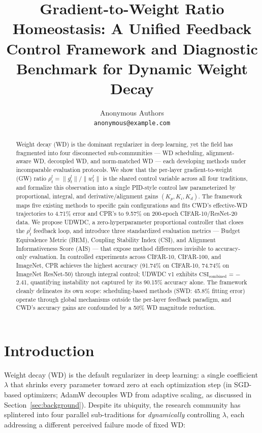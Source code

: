 \documentclass{article}
\title{Gradient-to-Weight Ratio Homeostasis: A Unified Feedback Control Framework and Diagnostic Benchmark for Dynamic Weight Decay}
\author{%
  Anonymous Authors \\
  \texttt{anonymous@example.com}
}
\begin{document}
\maketitle

\begin{abstract}
Weight decay (WD) is the dominant regularizer in deep learning, yet the field has fragmented into four disconnected sub-communities --- WD scheduling, alignment-aware WD, decoupled WD, and norm-matched WD --- each developing methods under incomparable evaluation protocols. We show that the per-layer gradient-to-weight (GW) ratio $\rho_t^l = \|g_t^l\| / \|w_t^l\|$ is the shared control variable across all four traditions, and formalize this observation into a single PID-style control law parameterized by proportional, integral, and derivative/alignment gains $(K_p, K_i, K_d)$. The framework maps five existing methods to specific gain configurations and fits CWD's effective-WD trajectories to 4.71\% error and CPR's to 9.57\% on 200-epoch CIFAR-10/ResNet-20 data. We propose UDWDC, a zero-hyperparameter proportional controller that closes the $\rho_t^l$ feedback loop, and introduce three standardized evaluation metrics --- Budget Equivalence Metric (BEM), Coupling Stability Index (CSI), and Alignment Informativeness Score (AIS) --- that expose method differences invisible to accuracy-only evaluation. In controlled experiments across CIFAR-10, CIFAR-100, and ImageNet, CPR achieves the highest accuracy (91.74\% on CIFAR-10, 74.74\% on ImageNet ResNet-50) through integral control; UDWDC v1 exhibits $\text{CSI}_\text{combined}$ = $-$2.41, quantifying instability not captured by its 90.15\% accuracy alone. The framework cleanly delineates its own scope: scheduling-based methods (SWD: 45.8\% fitting error) operate through global mechanisms outside the per-layer feedback paradigm, and CWD's accuracy gains are confounded by a 50\% WD magnitude reduction.
\end{abstract}

\section{Introduction}

Weight decay (WD) is the default regularizer in deep learning: a single coefficient $\lambda$ that shrinks every parameter toward zero at each optimization step (in SGD-based optimizers; AdamW decouples WD from adaptive scaling, as discussed in Section~\ref{sec:background}). Despite its ubiquity, the research community has splintered into four parallel sub-traditions for \textit{dynamically} controlling $\lambda$, each addressing a different perceived failure mode of fixed WD:
\end{document}

